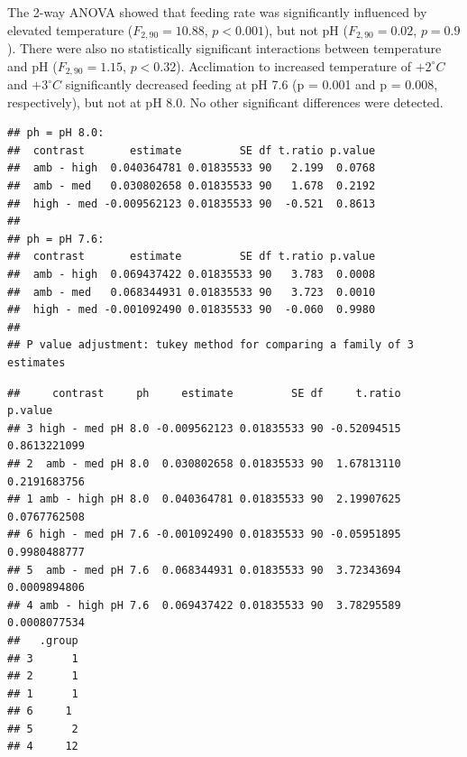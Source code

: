 \documentclass[oneside, a4paper]{memoir}
\newenvironment{Shaded}{\begin{snugshade}}{\end{snugshade}}
\newcommand{\KeywordTok}[1]{\textcolor[rgb]{0.13,0.29,0.53}{\textbf{#1}}}
\newcommand{\StringTok}[1]{\textcolor[rgb]{0.31,0.60,0.02}{#1}}
\newcommand{\OperatorTok}[1]{\textcolor[rgb]{0.81,0.36,0.00}{\textbf{#1}}}
\newcommand{\NormalTok}[1]{#1}
\theoremstyle{definition}
\theoremstyle{definition}
\theoremstyle{definition}
\theoremstyle{remark}
\begin{document}
The 2-way ANOVA showed that feeding rate was significantly influenced by
elevated temperature (\(F_{2,90} = 10.88\), \(p < 0.001\)), but not pH
(\(F_{2,90} = 0.02\), \(p = 0.9\)). There were also no statistically
significant interactions between temperature and pH
(\(F_{2,90} = 1.15\), \(p < 0.32\)). Acclimation to increased
temperature of \(+2 ^\circ C\) and \(+3 ^\circ C\) significantly
decreased feeding at pH 7.6 (p = 0.001 and p = 0.008, respectively), but
not at pH 8.0. No other significant differences were detected.

\begin{Shaded}
\end{Shaded}

\begin{verbatim}
## ph = pH 8.0:
##  contrast       estimate         SE df t.ratio p.value
##  amb - high  0.040364781 0.01835533 90   2.199  0.0768
##  amb - med   0.030802658 0.01835533 90   1.678  0.2192
##  high - med -0.009562123 0.01835533 90  -0.521  0.8613
## 
## ph = pH 7.6:
##  contrast       estimate         SE df t.ratio p.value
##  amb - high  0.069437422 0.01835533 90   3.783  0.0008
##  amb - med   0.068344931 0.01835533 90   3.723  0.0010
##  high - med -0.001092490 0.01835533 90  -0.060  0.9980
## 
## P value adjustment: tukey method for comparing a family of 3 estimates
\end{verbatim}

\begin{Shaded}
\end{Shaded}

\begin{verbatim}
##     contrast     ph     estimate         SE df     t.ratio      p.value
## 3 high - med pH 8.0 -0.009562123 0.01835533 90 -0.52094515 0.8613221099
## 2  amb - med pH 8.0  0.030802658 0.01835533 90  1.67813110 0.2191683756
## 1 amb - high pH 8.0  0.040364781 0.01835533 90  2.19907625 0.0767762508
## 6 high - med pH 7.6 -0.001092490 0.01835533 90 -0.05951895 0.9980488777
## 5  amb - med pH 7.6  0.068344931 0.01835533 90  3.72343694 0.0009894806
## 4 amb - high pH 7.6  0.069437422 0.01835533 90  3.78295589 0.0008077534
##   .group
## 3      1
## 2      1
## 1      1
## 6     1 
## 5      2
## 4     12
\end{verbatim}
\end{document}
